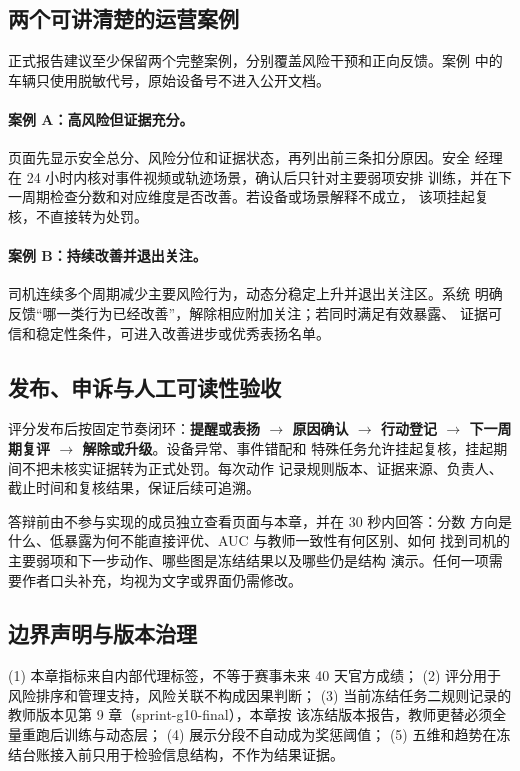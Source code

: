 \subsection{两个可讲清楚的运营案例}

正式报告建议至少保留两个完整案例，分别覆盖风险干预和正向反馈。案例
中的车辆只使用脱敏代号，原始设备号不进入公开文档。

\paragraph{案例 A：高风险但证据充分。}
页面先显示安全总分、风险分位和证据状态，再列出前三条扣分原因。安全
经理在 24 小时内核对事件视频或轨迹场景，确认后只针对主要弱项安排
训练，并在下一周期检查分数和对应维度是否改善。若设备或场景解释不成立，
该项挂起复核，不直接转为处罚。

\paragraph{案例 B：持续改善并退出关注。}
司机连续多个周期减少主要风险行为，动态分稳定上升并退出关注区。系统
明确反馈“哪一类行为已经改善”，解除相应附加关注；若同时满足有效暴露、
证据可信和稳定性条件，可进入改善进步或优秀表扬名单。

\subsection{发布、申诉与人工可读性验收}

评分发布后按固定节奏闭环：\textbf{提醒或表扬 $\to$ 原因确认 $\to$
行动登记 $\to$ 下一周期复评 $\to$ 解除或升级}。设备异常、事件错配和
特殊任务允许挂起复核，挂起期间不把未核实证据转为正式处罚。每次动作
记录规则版本、证据来源、负责人、截止时间和复核结果，保证后续可追溯。

答辩前由不参与实现的成员独立查看页面与本章，并在 30 秒内回答：分数
方向是什么、低暴露为何不能直接评优、AUC 与教师一致性有何区别、如何
找到司机的主要弱项和下一步动作、哪些图是冻结结果以及哪些仍是结构
演示。任何一项需要作者口头补充，均视为文字或界面仍需修改。

\subsection{边界声明与版本治理}

(1) 本章指标来自内部代理标签，不等于赛事未来 40 天官方成绩；
(2) 评分用于风险排序和管理支持，风险关联不构成因果判断；
(3) 当前冻结任务二规则记录的教师版本见第 9 章（sprint-g10-final），本章按
该冻结版本报告，教师更替必须全量重跑后训练与动态层；
(4) 展示分段不自动成为奖惩阈值；
(5) 五维和趋势在冻结台账接入前只用于检验信息结构，不作为结果证据。
